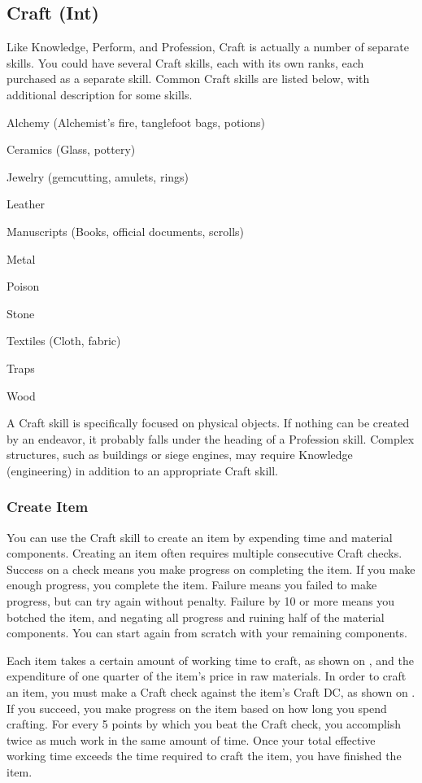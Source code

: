 \subsection{Craft (Int)}
Like Knowledge, Perform, and Profession, Craft is actually a number of separate skills. You could have several Craft skills, each with its own ranks, each purchased as a separate skill. Common Craft skills are listed below, with additional description for some skills.

\begin{itemize*}
  \item Alchemy (Alchemist's fire, tanglefoot bags, potions)
  \item Ceramics (Glass, pottery)
  \item Jewelry (gemcutting, amulets, rings)
  \item Leather
  \item Manuscripts (Books, official documents, scrolls)
  \item Metal
  \item Poison
  \item Stone
  \item Textiles (Cloth, fabric)
  \item Traps
  \item Wood
\end{itemize*}

A Craft skill is specifically focused on physical objects. If nothing can be created by an endeavor, it probably falls under the heading of a Profession skill. Complex structures, such as buildings or siege engines, may require Knowledge (engineering) in addition to an appropriate Craft skill.

\subsubsection{Create Item}
You can use the Craft skill to create an item by expending time and material components. Creating an item often requires multiple consecutive Craft checks. Success on a check means you make progress on completing the item. If you make enough progress, you complete the item. Failure means you failed to make progress, but can try again without penalty. Failure by 10 or more means you botched the item, and negating all progress and ruining half of the material components. You can start again from scratch with your remaining components.

Each item takes a certain amount of working time to craft, as shown on , and the expenditure of one quarter of the item's price in raw materials. In order to craft an item, you must make a Craft check against the item's Craft DC, as shown on . If you succeed, you make progress on the item based on how long you spend crafting. For every 5 points by which you beat the Craft check, you accomplish twice as much work in the same amount of time. Once your total effective working time exceeds the time required to craft the item, you have finished the item.

